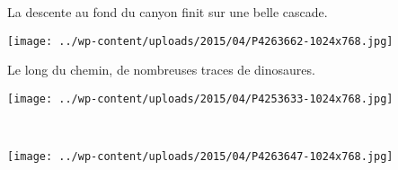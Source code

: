  La descente au fond du canyon finit sur une belle cascade. 
\begin{center} \texttt{[image: ../wp-content/uploads/2015/04/P4263662-1024x768.jpg]} \end{center}
\vspace{-\topsep}

\pagebreak
 Le long du chemin, de nombreuses traces de dinosaures. 
 \vfill
\begin{center} \texttt{[image: ../wp-content/uploads/2015/04/P4253633-1024x768.jpg]} \end{center}
\vfill
~
\vfill
\begin{center} \texttt{[image: ../wp-content/uploads/2015/04/P4263647-1024x768.jpg]} \end{center}
\vspace{-\topsep}
\vspace{-0.75mm}